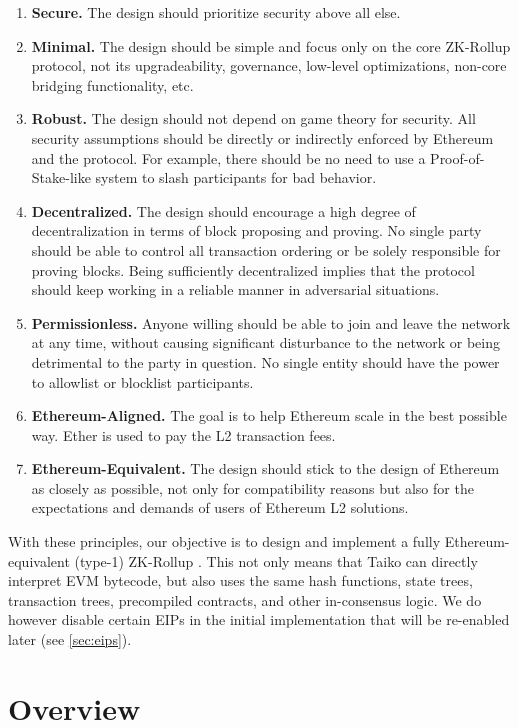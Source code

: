 \documentclass[9pt,oneside]{amsart}
\begin{document}
\begin{multicols}{2}
\begin{enumerate}
\item \textbf{Secure.} The design should prioritize security above all else.
\item \textbf{Minimal.} The design should be simple and focus only on the core ZK-Rollup protocol, not its upgradeability, governance, low-level optimizations, non-core bridging functionality, etc.
\item  \textbf{Robust.} The design should not depend on game theory for security. All security assumptions should be directly or indirectly enforced by Ethereum and the protocol. For example, there should be no need to use a Proof-of-Stake-like system to slash participants for bad behavior.
\item \textbf{Decentralized.} The design should encourage a high degree of decentralization in terms of block proposing and proving. No single party should be able to control all transaction ordering or be solely responsible for proving blocks. Being sufficiently decentralized implies that the protocol should keep working in a reliable manner in adversarial situations.
\item \textbf{Permissionless.} Anyone willing should be able to join and leave the network at any time, without causing significant disturbance to the network or being detrimental to the party in question. No single entity should have the power to allowlist or blocklist participants.
\item \textbf{Ethereum-Aligned.} The goal is to help Ethereum scale in the best possible way. Ether is used to pay the L2 transaction fees.
\item \textbf{Ethereum-Equivalent.} The design should stick to the design of Ethereum as closely as possible, not only for compatibility reasons but also for the expectations and demands of users of Ethereum L2 solutions.
\end{enumerate}

With these principles, our objective is to design and implement a fully Ethereum-equivalent (type-1) ZK-Rollup \cite{vitalik-zkevm}. This not only means that Taiko can directly interpret EVM bytecode, but also uses the same hash functions, state trees, transaction trees, precompiled contracts, and other in-consensus logic. We do however disable certain EIPs in the initial implementation\cite{taikoprotogithub} that will be re-enabled later (see \ref{sec:eips}).

\section{Overview}\label{sec:properties}


\end{multicols}
\end{document}
